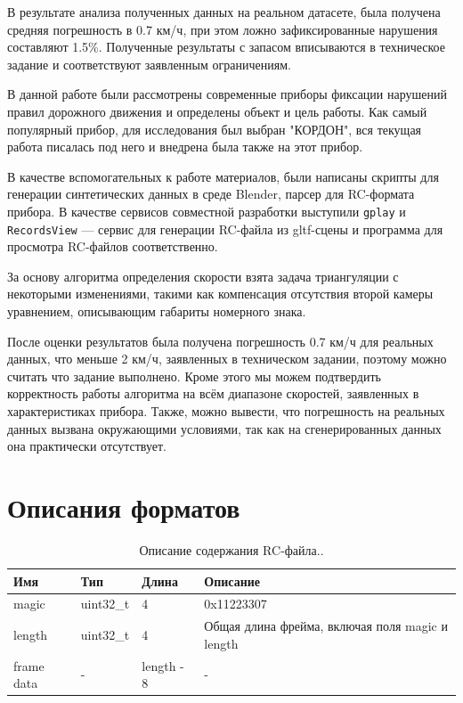 \documentclass[specification,annotation,times]{itmo-student-thesis}
\begin{document}
В результате анализа полученных данных на реальном датасете, была получена средняя погрешность в 0.7 км/ч, при этом ложно зафиксированные нарушения составляют 1.5\%. Полученные результаты с запасом вписываются в техническое задание и соответствуют заявленным ограничениям.

\startconclusionpage
В данной работе были рассмотрены современные приборы фиксации нарушений правил дорожного движения и определены объект и цель работы. Как самый популярный прибор, для исследования был выбран "КОРДОН", вся текущая работа писалась под него и внедрена была также на этот прибор.

В качестве вспомогательных к работе материалов, были написаны скрипты для генерации синтетических данных в среде Blender, парсер для RC-формата прибора. В качестве сервисов совместной разработки выступили \texttt{gplay} и \texttt{RecordsView} --- сервис для генерации RC-файла из gltf-сцены и программа для просмотра RC-файлов соответственно.

За основу алгоритма определения скорости взята задача триангуляции с некоторыми изменениями, такими как компенсация отсутствия второй камеры уравнением, описывающим габариты номерного знака.

 После оценки результатов была получена погрешность 0.7 км/ч для реальных данных, что меньше 2 км/ч, заявленных в техническом задании, поэтому можно считать что задание выполнено. Кроме этого мы можем подтвердить корректность работы алгоритма на всём диапазоне скоростей, заявленных в характеристиках прибора. Также, можно вывести, что погрешность на реальных данных вызвана окружающими условиями, так как на сгенерированных данных она практически отсутствует.

\printmainbibliography

\appendix

\chapter{Описания форматов}\label{sec:app:1}

\begin{table}[!ht]
	\caption{Описание содержания RC-файла..}\label{tb1:rc-type}
	\centering
	\begin{tabular}{|p{}|p{}|p{}|p{}|}\hline
		\textbf{Имя} & \textbf{Тип}	&\textbf{Длина}&	\textbf{Описание} \\\hline\hline
		magic	& uint32\_t&	4 &	0x11223307\\\hline
		length	&uint32\_t	&4 &	Общая длина фрейма, включая поля magic и length\\\hline
		frame data&	- &	length - 8	 & -\\\hline
	\end{tabular}
\end{table}
\end{document}
